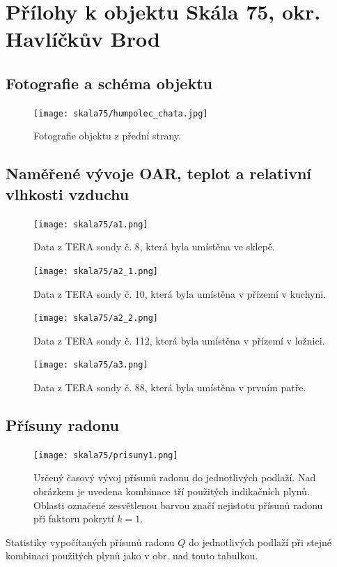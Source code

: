 \chapter{Přílohy k objektu Skála 75, okr. Havlíčkův Brod}\label{navesti:priloha_skala75}

\section{Fotografie a schéma objektu}

\begin{figure}[H]
    \centering
    \texttt{[image: skala75/humpolec\_chata.jpg]}
    \caption{Fotografie objektu z přední strany.}
    \label{fig:skala75}
\end{figure}

\section{Naměřené vývoje OAR, teplot a relativní vlhkosti vzduchu}

\begin{figure}[H]
    \centering
    \texttt{[image: skala75/a1.png]}
    \caption{Data z TERA sondy č. 8, která byla umístěna ve sklepě.}
    \label{fig:skala75_a1}
\end{figure}
\begin{figure}[H]
    \centering
    \texttt{[image: skala75/a2\_1.png]}
    \caption{Data z TERA sondy č. 10, která byla umístěna v přízemí v kuchyni.}
    \label{fig:skala75_a2_1}
\end{figure}
\begin{figure}[H]
    \centering
    \texttt{[image: skala75/a2\_2.png]}
    \caption{Data z TERA sondy č. 112, která byla umístěna v přízemí v ložnici.}
    \label{fig:skala75_a2_2}
\end{figure}
\begin{figure}[H]
    \centering
    \texttt{[image: skala75/a3.png]}
    \caption{Data z TERA sondy č. 88, která byla umístěna v prvním patře.}
    \label{fig:skala75_a3}
\end{figure}

\section{Přísuny radonu}

\begin{figure}[H]
    \centering
    \texttt{[image: skala75/prisuny1.png]}
    \caption{Určený časový vývoj přísunů radonu do jednotlivých podlaží. Nad obrázkem je uvedena kombinace tří použitých indikačních plynů. Oblasti označené zesvětlenou barvou značí nejistotu přísunů radonu při faktoru pokrytí $k=1$.}
    \label{fig:skala75_prisuny1}
\end{figure}
\begin{table}[H]
    \centering
    \caption{Statistiky vypočítaných přísunů radonu $Q$ do jednotlivých podlaží při stejné kombinaci použitých plynů jako v obr. nad touto tabulkou.}
    \label{tab:skala75_prisuny1}
    
\end{table}

